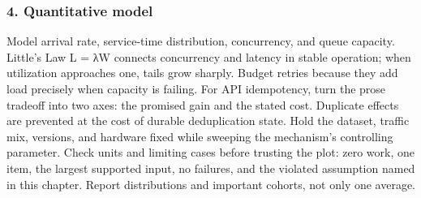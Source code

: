 \subsubsection*{4. Quantitative model}
Model arrival rate, service-time distribution, concurrency, and queue capacity. Little's Law L = λW connects concurrency and latency in stable operation; when utilization approaches one, tails grow sharply. Budget retries because they add load precisely when capacity is failing.
For API idempotency, turn the prose tradeoff into two axes: the promised gain and the stated cost. Duplicate effects are prevented at the cost of durable deduplication state. Hold the dataset, traffic mix, versions, and hardware fixed while sweeping the mechanism's controlling parameter.
Check units and limiting cases before trusting the plot: zero work, one item, the largest supported input, no failures, and the violated assumption named in this chapter. Report distributions and important cohorts, not only one average.
